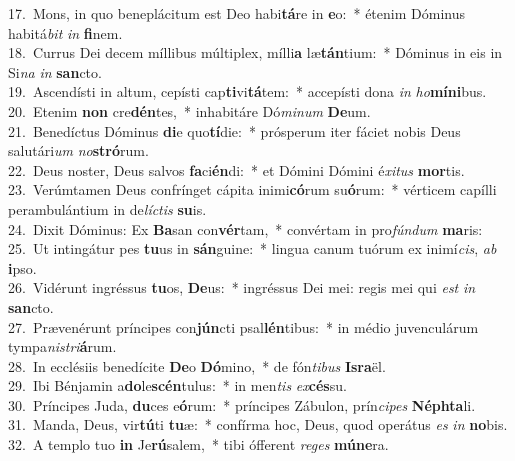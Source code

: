 {17.~}Mons, in quo beneplácitum est Deo habi\textbf{tá}re in \textbf{e}o:~* étenim Dóminus habitá\textit{bit} \textit{in} \textbf{fi}nem.\\
{18.~}Currus Dei decem míllibus múltiplex, mílli\textbf{a} læ\textbf{tán}tium:~* Dóminus in eis in Si\textit{na} \textit{in} \textbf{san}cto.\\
{19.~}Ascendísti in altum, cepísti cap\textbf{ti}vi\textbf{tá}tem:~* accepísti dona \textit{in} \textit{ho}\textbf{mí}\textbf{ni}bus.\\
{20.~}Etenim \textbf{non} cre\textbf{dén}tes,~* inhabitáre Dó\textit{mi}\textit{num} \textbf{De}um.\\
{21.~}Benedíctus Dóminus \textbf{di}e quo\textbf{tí}die:~* prósperum iter fáciet nobis Deus salutári\textit{um} \textit{no}\textbf{stró}rum.\\
{22.~}Deus noster, Deus salvos \textbf{fa}ci\textbf{én}di:~* et Dómini Dómini é\textit{xi}\textit{tus} \textbf{mor}tis.\\
{23.~}Verúmtamen Deus confrínget cápita inimi\textbf{có}rum su\textbf{ó}rum:~* vérticem capílli perambulántium in de\textit{lí}\textit{ctis} \textbf{su}is.\\
{24.~}Dixit Dóminus: Ex \textbf{Ba}san con\textbf{vér}tam,~* convértam in pro\textit{fún}\textit{dum} \textbf{ma}ris:\\
{25.~}Ut intingátur pes \textbf{tu}us in \textbf{sán}guine:~* lingua canum tuórum ex inimí\textit{cis}, \textit{ab} \textbf{i}pso.\\
{26.~}Vidérunt ingréssus \textbf{tu}os, \textbf{De}us:~* ingréssus Dei mei: regis mei qui \textit{est} \textit{in} \textbf{san}cto.\\
{27.~}Prævenérunt príncipes con\textbf{jún}cti psal\textbf{lén}tibus:~* in médio juvenculárum tympa\textit{ni}\textit{stri}\textbf{á}rum.\\
{28.~}In ecclésiis benedícite \textbf{De}o \textbf{Dó}mino,~* de fón\textit{ti}\textit{bus} \textbf{Is}\textbf{ra}ël.\\
{29.~}Ibi Bénjamin a\textbf{do}le\textbf{scén}tulus:~* in men\textit{tis} \textit{ex}\textbf{cés}su.\\
{30.~}Príncipes Juda, \textbf{du}ces e\textbf{ó}rum:~* príncipes Zábulon, prín\textit{ci}\textit{pes} \textbf{Né}\textbf{phta}li.\\
{31.~}Manda, Deus, vir\textbf{tú}ti \textbf{tu}æ:~* confírma hoc, Deus, quod operátus \textit{es} \textit{in} \textbf{no}bis.\\
{32.~}A templo tuo \textbf{in} Je\textbf{rú}salem,~* tibi ófferent \textit{re}\textit{ges} \textbf{mú}\textbf{ne}ra.\\

